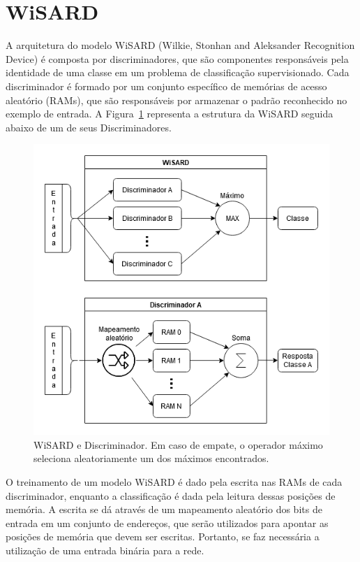 \section{WiSARD}
    A arquitetura do modelo WiSARD (Wilkie, Stonhan and Aleksander Recognition Device) é composta por discriminadores, que são componentes responsáveis pela identidade de uma classe em um problema de classificação supervisionado. Cada discriminador é formado por um conjunto específico de memórias de acesso aleatório (RAMs), que são responsáveis por armazenar o padrão reconhecido no exemplo de entrada. A Figura~\ref{fig:wsd_disc} representa a estrutura da WiSARD seguida abaixo de um de seus Discriminadores.
    
    \begin{figure}[!ht] \label{fig:wsd_disc}
    \centering
    \includegraphics[width=5.0in]{img/wisard_discriminator.png}
    \caption{WiSARD e Discriminador. Em caso de empate, o operador máximo seleciona aleatoriamente um dos máximos encontrados.}
    \end{figure}
    
    O treinamento de um modelo WiSARD é dado pela escrita nas RAMs de cada discriminador, enquanto a classificação é dada pela leitura dessas posições de memória. A escrita se dá através de um mapeamento aleatório dos bits de entrada em um conjunto de endereços, que serão utilizados para apontar as posições de memória que devem ser escritas. Portanto, se faz necessária a utilização de uma entrada binária para a rede.
    
